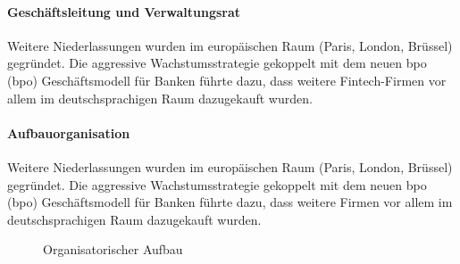 \paragraph*{Geschäftsleitung und Verwaltungsrat}\mbox{}
\begin{sloppypar}
Weitere Niederlassungen wurden im europäischen Raum (Paris, London, Brüssel) gegründet. Die aggressive Wachstumsstrategie gekoppelt mit dem neuen \acrshort{bpo} (\acrlong{bpo}) Geschäftsmodell für Banken führte dazu, dass weitere Fintech-Firmen vor allem im deutschsprachigen Raum dazugekauft wurden.
\end{sloppypar}

\paragraph*{Aufbauorganisation}\mbox{} 

\begin{sloppypar}
Weitere Niederlassungen wurden im europäischen Raum (Paris, London, Brüssel) gegründet. Die aggressive Wachstumsstrategie gekoppelt mit dem neuen \acrshort{bpo} (\acrlong{bpo}) Geschäftsmodell für Banken führte dazu, dass weitere Firmen vor allem im deutschsprachigen Raum dazugekauft wurden.
\end{sloppypar}


\begin{figure}[H]
    \centering
    
    \caption{Organisatorischer Aufbau}
    \label{fig:organisation}
\end{figure}

